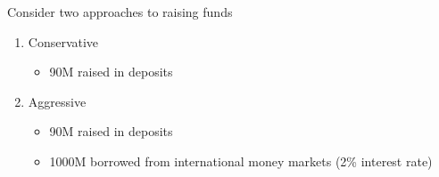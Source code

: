 \documentclass{beamer}
\begin{document}
\begin{frame}
  Consider two approaches to raising funds  
\begin{enumerate}
  \item Conservative 
  \begin{itemize}
    \item  90M raised in deposits
  \end{itemize} 
 \item Aggressive 
  \begin{itemize}
    \item 90M raised in deposits
    \item 1000M borrowed from international money markets (2\% interest rate)
  \end{itemize}
\end{enumerate}
\end{frame}
\end{document}
